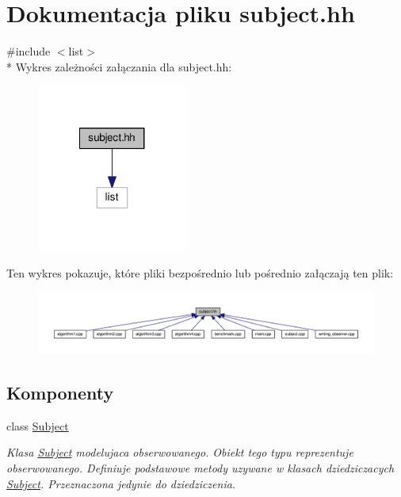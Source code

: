 \hypertarget{subject_8hh}{\section{Dokumentacja pliku subject.\-hh}
\label{subject_8hh}
}
{\ttfamily \#include $<$list$>$}\\*
Wykres zależności załączania dla subject.\-hh\-:
\nopagebreak
\begin{figure}[H]
\begin{center}
\leavevmode
\includegraphics[width=140pt]{subject_8hh__incl}
\end{center}
\end{figure}
Ten wykres pokazuje, które pliki bezpośrednio lub pośrednio załączają ten plik\-:
\nopagebreak
\begin{figure}[H]
\begin{center}
\leavevmode
\includegraphics[width=350pt]{subject_8hh__dep__incl}
\end{center}
\end{figure}
\subsection*{Komponenty}
\begin{DoxyCompactItemize}
\item 
class \hyperlink{class_subject}{Subject}
\begin{DoxyCompactList}\small\item\em Klasa \hyperlink{class_subject}{Subject} modelujaca obserwowanego. Obiekt tego typu reprezentuje obserwowanego. Definiuje podstawowe metody uzywane w klasach dziedziczacych \hyperlink{class_subject}{Subject}. Przeznaczona jedynie do dziedziczenia. \end{DoxyCompactList}\end{DoxyCompactItemize}
